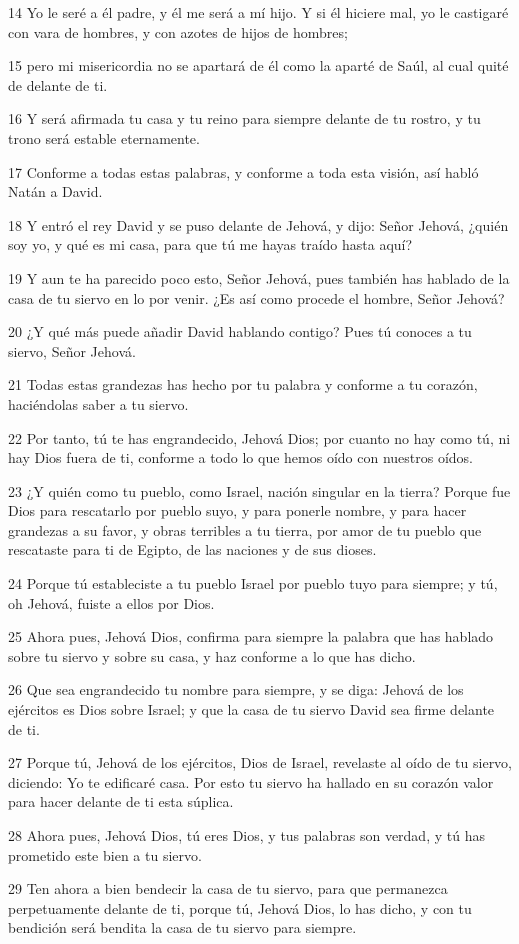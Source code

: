 \par 14 Yo le seré a él padre, y él me será a mí hijo. Y si él hiciere mal, yo le castigaré con vara de hombres, y con azotes de hijos de hombres;
\par 15 pero mi misericordia no se apartará de él como la aparté de Saúl, al cual quité de delante de ti.
\par 16 Y será afirmada tu casa y tu reino para siempre delante de tu rostro, y tu trono será estable eternamente.
\par 17 Conforme a todas estas palabras, y conforme a toda esta visión, así habló Natán a David.
\par 18 Y entró el rey David y se puso delante de Jehová, y dijo: Señor Jehová, ¿quién soy yo, y qué es mi casa, para que tú me hayas traído hasta aquí?
\par 19 Y aun te ha parecido poco esto, Señor Jehová, pues también has hablado de la casa de tu siervo en lo por venir. ¿Es así como procede el hombre, Señor Jehová?
\par 20 ¿Y qué más puede añadir David hablando contigo? Pues tú conoces a tu siervo, Señor Jehová.
\par 21 Todas estas grandezas has hecho por tu palabra y conforme a tu corazón, haciéndolas saber a tu siervo.
\par 22 Por tanto, tú te has engrandecido, Jehová Dios; por cuanto no hay como tú, ni hay Dios fuera de ti, conforme a todo lo que hemos oído con nuestros oídos.
\par 23 ¿Y quién como tu pueblo, como Israel, nación singular en la tierra? Porque fue Dios para rescatarlo por pueblo suyo, y para ponerle nombre, y para hacer grandezas a su favor, y obras terribles a tu tierra, por amor de tu pueblo que rescataste para ti de Egipto, de las naciones y de sus dioses.
\par 24 Porque tú estableciste a tu pueblo Israel por pueblo tuyo para siempre; y tú, oh Jehová, fuiste a ellos por Dios.
\par 25 Ahora pues, Jehová Dios, confirma para siempre la palabra que has hablado sobre tu siervo y sobre su casa, y haz conforme a lo que has dicho.
\par 26 Que sea engrandecido tu nombre para siempre, y se diga: Jehová de los ejércitos es Dios sobre Israel; y que la casa de tu siervo David sea firme delante de ti.
\par 27 Porque tú, Jehová de los ejércitos, Dios de Israel, revelaste al oído de tu siervo, diciendo: Yo te edificaré casa. Por esto tu siervo ha hallado en su corazón valor para hacer delante de ti esta súplica.
\par 28 Ahora pues, Jehová Dios, tú eres Dios, y tus palabras son verdad, y tú has prometido este bien a tu siervo.
\par 29 Ten ahora a bien bendecir la casa de tu siervo, para que permanezca perpetuamente delante de ti, porque tú, Jehová Dios, lo has dicho, y con tu bendición será bendita la casa de tu siervo para siempre.

